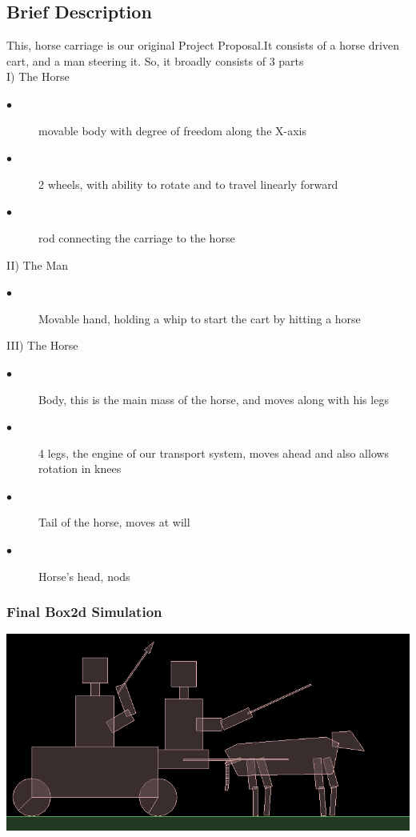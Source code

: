 \documentclass[11pt]{article}
\begin{document}
	\subsection*{Brief Description}
	This, horse carriage is our original Project Proposal.It consists of a horse driven cart, and a man steering it. So, it broadly 	consists of 3 parts \\I) The Horse
	\begin{description}
		\item[$\bullet$ ] movable body with degree of freedom along the X-axis
		\item[$\bullet$ ] 2 wheels, with ability to rotate and to travel linearly forward
		\item[$\bullet$ ] rod connecting the carriage to the horse
	\end{description}II) The Man 
	\begin{description}
		\item[$\bullet$ ] Movable hand, holding a whip to start the cart by hitting a horse
	\end{description}
	III) The Horse
	\begin{description}
		\item[$\bullet$ ] Body, this is the main mass of the horse, and moves along with his legs
		\item[$\bullet$ ] 4 legs, the engine of our transport system, moves ahead and also allows rotation in knees
		\item[$\bullet$ ] Tail of the horse, moves at will
		\item[$\bullet$ ] Horse's head, nods 
	\end{description}
	\begin{center}
	\subsubsection*{Final Box2d Simulation}
	\includegraphics[scale=0.35]{./images/final.png}
	\end{center}
\end{document}
